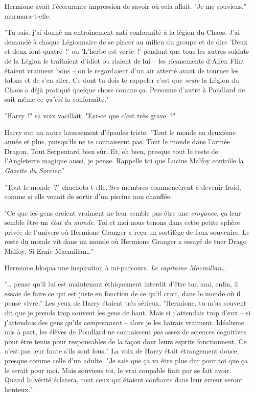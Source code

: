 Hermione avait l'écœurante impression de savoir où cela allait. "Je me souviens," murmura-t-elle.

"Tu sais, j'ai donné un entraînement anti-conformité à la légion du Chaos. J'ai demandé à chaque Légionnaire de se placer au milieu du groupe et de dire 'Deux et deux font quatre~!' ou 'L'herbe est verte~!' pendant que tous les autres soldats de la Légion le traitaient d'idiot ou riaient de lui -- les ricanements d'Allen Flint étaient vraiment bons -- ou le regardaient d'un air atterré avant de tourner les talons et de s'en aller. Ce dont tu dois te rappeler c'est que \emph{seule} la Légion du Chaos a déjà pratiqué quelque chose comme ça. Personne d'autre à Poudlard ne sait même ce \emph{qu'est} la conformité."

"Harry~!" sa voix vacillait. "Est-ce que c'est très grave~?"

Harry eut un autre haussement d'épaules triste. "Tout le monde en deuxième année et plus, puisqu'ils ne te connaissent pas. Tout le monde dans l'armée Dragon. Tout Serpentard bien sûr. Et, eh bien, presque tout le reste de l'Angleterre magique aussi, je pense. Rappelle toi que Lucius Malfoy contrôle la \emph{Gazette du Sorcier}."

"Tout le monde~?" chuchota-t-elle. Ses membres commencèrent à devenir froid, comme si elle venait de sortir d'un piscine non chauffée.

"Ce que les gens croient vraiment ne leur semble pas être une \emph{croyance}, ça leur semble être un \emph{état du monde}. Toi et moi nous tenons dans cette petite sphère privée de l'univers où Hermione Granger a reçu un sortilège de faux souvenirs. Le reste du monde vit dans un monde où Hermione Granger a essayé de tuer Drago Malfoy. Si Ernie Macmillan…"

Hermione bloqua une inspiration à mi-parcours. \emph{Le capitaine Macmillan…}

"… pense qu'il lui est maintenant éthiquement interdit d'être ton ami, enfin, il essaie de faire ce qui est juste en fonction de ce qu'il croit, dans le monde où il pense vivre." Les yeux de Harry étaient très sérieux. "Hermione, tu m'as souvent dit que je prends trop souvent les gens de haut. Mais si j'attendais trop d'eux -- si j'attendais des gens qu'ils \emph{comprennent} -- alors je les haïrais vraiment. Idéalisme mis à part, les élèves de Poudlard ne connaissent \emph{pas} assez de sciences cognitives pour être tenus pour responsables de la façon dont leurs esprits fonctionnent. Ce n'est pas leur faute s'ils sont fous." La voix de Harry était étrangement douce, presque comme celle d'un adulte. "Je sais que ça va être plus dur pour toi que ça le serait pour moi. Mais souviens toi, le vrai coupable finit par se fait avoir. Quand la vérité éclatera, tout ceux qui étaient confiants dans leur erreur seront honteux."

